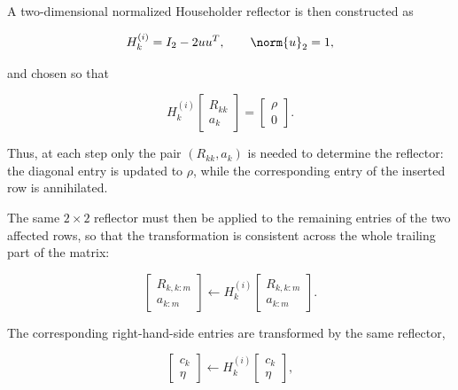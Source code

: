\noindent A two-dimensional normalized Householder reflector is then constructed as

\begin{equation}
    H_k^{(i)} = I_2 - 2u u^T,
    \qquad \norm{u}_2=1,
\end{equation}

\noindent and chosen so that

\begin{equation}
    H_k^{(i)}
    \begin{bmatrix}
        R_{kk} \\
        a_k
    \end{bmatrix}
    =
    \begin{bmatrix}
        \rho \\
        0
    \end{bmatrix}.
\end{equation}

\noindent Thus, at each step only the pair $(R_{kk},a_k)$ is needed to determine the
reflector: the diagonal entry is updated to $\rho$, while the corresponding
entry of the inserted row is annihilated.

\noindent The same $2\times2$ reflector must then be applied to the remaining entries
of the two affected rows, so that the transformation is consistent across
the whole trailing part of the matrix:

\begin{equation}
    \begin{bmatrix}
        R_{k,k:m} \\
        a_{k:m}
    \end{bmatrix}
    \leftarrow
    H_k^{(i)}
    \begin{bmatrix}
        R_{k,k:m} \\
        a_{k:m}
    \end{bmatrix}.
\end{equation}

\noindent The corresponding right-hand-side entries are transformed by the same reflector,

\begin{equation}
    \begin{bmatrix}
        c_k \\
        \eta
    \end{bmatrix}
    \leftarrow
    H_k^{(i)}
    \begin{bmatrix}
        c_k \\
        \eta
    \end{bmatrix},
\end{equation}


